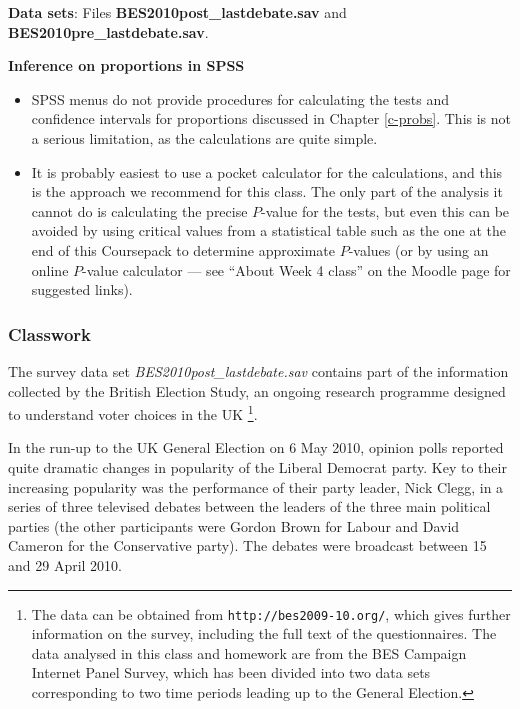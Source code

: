\documentclass[11pt,a4paper,openany]{book}
\let\rmarkdownfootnote\footnote%
\def\footnote{\protect\rmarkdownfootnote}
\begin{document}
\textbf{Data sets}: Files \textbf{BES2010post\_lastdebate.sav} and
\textbf{BES2010pre\_lastdebate.sav}.

\textbf{Inference on proportions in SPSS}

\begin{itemize}
\item
  SPSS menus do not provide procedures for calculating the tests and
  confidence intervals for proportions discussed in Chapter
  \ref{c-probs}. This is not a serious limitation, as the calculations
  are quite simple.
\item
  It is probably easiest to use a pocket calculator for the
  calculations, and this is the approach we recommend for this class.
  The only part of the analysis it cannot do is calculating the precise
  \(P\)-value for the tests, but even this can be avoided by using
  critical values from a statistical table such as the one at the end of
  this Coursepack to determine approximate \(P\)-values (or by using an
  online \(P\)-value calculator --- see ``About Week 4 class'' on the
  Moodle page for suggested links).
\end{itemize}

\subsubsection*{Classwork}\label{classwork-3}

The survey data set \emph{BES2010post\_lastdebate.sav} contains part of
the information collected by the British Election Study, an ongoing
research programme designed to understand voter choices in the UK
\footnote{The data can be obtained from \texttt{http://bes2009-10.org/},
  which gives further information on the survey, including the full text
  of the questionnaires. The data analysed in this class and homework
  are from the BES Campaign Internet Panel Survey, which has been
  divided into two data sets corresponding to two time periods leading
  up to the General Election.}.

In the run-up to the UK General Election on 6 May 2010, opinion polls
reported quite dramatic changes in popularity of the Liberal Democrat
party. Key to their increasing popularity was the performance of their
party leader, Nick Clegg, in a series of three televised debates between
the leaders of the three main political parties (the other participants
were Gordon Brown for Labour and David Cameron for the Conservative
party). The debates were broadcast between 15 and 29 April 2010.
\end{document}
